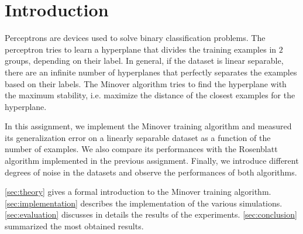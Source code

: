 \section{Introduction}
\label{sec:introduction}

Perceptrons are devices used to solve binary classification problems.
The perceptron tries to learn a hyperplane that divides the training examples in $2$ groups, depending on their label.
In general, if the dataset is linear separable, there are an infinite number of hyperplanes that perfectly separates the examples based on their labels.
The Minover algorithm tries to find the hyperplane with the maximum stability, i.e. maximize the distance of the closest examples for the hyperplane.

In this assignment, we implement the Minover training algorithm and measured its generalization error on a linearly separable dataset as a function of the number of examples.
We also compare its performances with the Rosenblatt algorithm implemented in the previous assignment.
Finally, we introduce different degrees of noise in the datasets and observe the performances of both algorithms.

\cref{sec:theory} gives a formal introduction to the Minover training algorithm.
\cref{sec:implementation} describes the implementation of the various simulations.
\cref{sec:evaluation} discusses in details the results of the experiments.
\cref{sec:conclusion} summarized the most obtained results.
